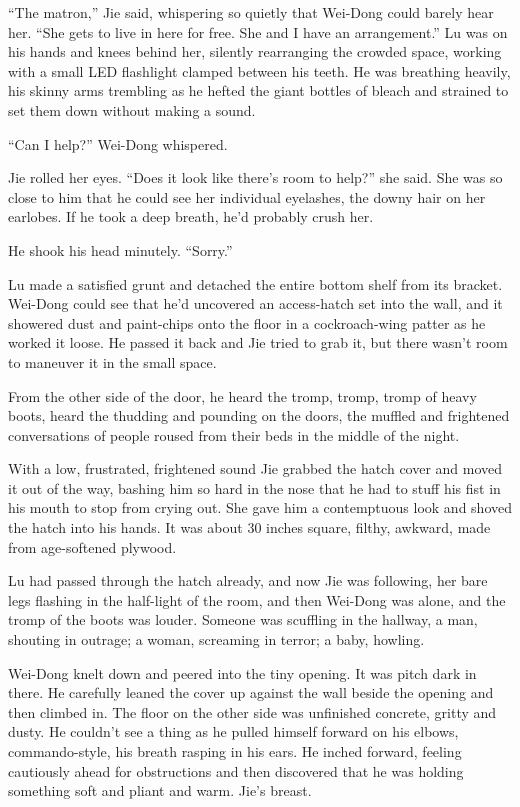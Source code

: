 ``The matron,'' Jie said, whispering so quietly that Wei-Dong could
barely hear her. ``She gets to live in here for free. She and I have
an arrangement.'' Lu was on his hands and knees behind her, silently
rearranging the crowded space, working with a small LED flashlight
clamped between his teeth. He was breathing heavily, his skinny
arms trembling as he hefted the giant bottles of bleach and
strained to set them down without making a sound.

``Can I help?'' Wei-Dong whispered.

Jie rolled her eyes. ``Does it look like there's room to help?'' she
said. She was so close to him that he could see her individual
eyelashes, the downy hair on her earlobes. If he took a deep
breath, he'd probably crush her.

He shook his head minutely. ``Sorry.''

Lu made a satisfied grunt and detached the entire bottom shelf from
its bracket. Wei-Dong could see that he'd uncovered an access-hatch
set into the wall, and it showered dust and paint-chips onto the
floor in a cockroach-wing patter as he worked it loose. He passed
it back and Jie tried to grab it, but there wasn't room to maneuver
it in the small space.

From the other side of the door, he heard the tromp, tromp, tromp
of heavy boots, heard the thudding and pounding on the doors, the
muffled and frightened conversations of people roused from their
beds in the middle of the night.

With a low, frustrated, frightened sound Jie grabbed the hatch
cover and moved it out of the way, bashing him so hard in the nose
that he had to stuff his fist in his mouth to stop from crying out.
She gave him a contemptuous look and shoved the hatch into his
hands. It was about 30 inches square, filthy, awkward, made from
age-softened plywood.

Lu had passed through the hatch already, and now Jie was following,
her bare legs flashing in the half-light of the room, and then
Wei-Dong was alone, and the tromp of the boots was louder. Someone
was scuffling in the hallway, a man, shouting in outrage; a woman,
screaming in terror; a baby, howling.

Wei-Dong knelt down and peered into the tiny opening. It was pitch
dark in there. He carefully leaned the cover up against the wall
beside the opening and then climbed in. The floor on the other side
was unfinished concrete, gritty and dusty. He couldn't see a thing
as he pulled himself forward on his elbows, commando-style, his
breath rasping in his ears. He inched forward, feeling cautiously
ahead for obstructions and then discovered that he was holding
something soft and pliant and warm. Jie's breast.


